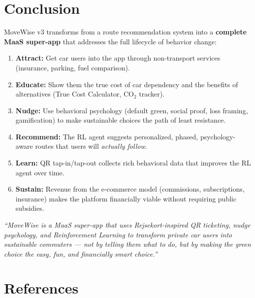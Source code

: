 \documentclass[11pt,a4paper]{article}
\begin{document}
\section{Conclusion}

MoveWise v3 transforms from a route recommendation system into a \textbf{complete MaaS super-app} that addresses the full lifecycle of behavior change:

\begin{enumerate}
    \item \textbf{Attract:} Get car users into the app through non-transport services (insurance, parking, fuel comparison).
    \item \textbf{Educate:} Show them the true cost of car dependency and the benefits of alternatives (True Cost Calculator, CO$_2$ tracker).
    \item \textbf{Nudge:} Use behavioral psychology (default green, social proof, loss framing, gamification) to make sustainable choices the path of least resistance.
    \item \textbf{Recommend:} The RL agent suggests personalized, phased, psychology-aware routes that users will \textit{actually follow}.
    \item \textbf{Learn:} QR tap-in/tap-out collects rich behavioral data that improves the RL agent over time.
    \item \textbf{Sustain:} Revenue from the e-commerce model (commissions, subscriptions, insurance) makes the platform financially viable without requiring public subsidies.
\end{enumerate}

\begin{tcolorbox}[colback=lightyellow,colframe=deeporange,title=\textbf{The One-Sentence Pitch (v3)}]
\centering
\textit{``MoveWise is a MaaS super-app that uses Rejsekort-inspired QR ticketing, nudge psychology, and Reinforcement Learning to transform private car users into sustainable commuters --- not by telling them what to do, but by making the green choice the easy, fun, and financially smart choice.''}
\end{tcolorbox}

\section*{References}
\end{document}
